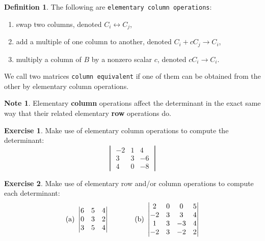\documentclass{beamer}
\newcommand{\fn}{\insertframenumber}
\theoremstyle{definition}
\newtheorem{exercise}{Exercise}
\newtheorem*{defn}{Definition}
\newtheorem*{nb}{Note}
\renewcommand{\emph}[1]{{\color{blue}\texttt{#1}}}
\begin{document}
\begin{frame}{\fn}
\begin{defn}
	The following are \emph{elementary column operations}:
	\begin{enumerate}[label=\textbf{\arabic*.}]
		\item swap two columns, denoted $C_i\leftrightarrow C_j$,
		\item add a multiple of one column to another, denoted $C_i+cC_j\rightarrow C_i$,
		\item multiply a column of $B$ by a nonzero scalar $c$, denoted $cC_i\rightarrow C_i$.
	\end{enumerate} 
	We call two matrices \emph{column equivalent} if one of them can be obtained from the other by elementary column operations.
\end{defn}
\begin{nb}
	Elementary \textbf{column} operations affect the determinant in the exact same way that their related elementary \textbf{row} operations do.
\end{nb}
\end{frame}
\begin{frame}{\fn}
\begin{exercise}
	Make use of elementary column operations to compute the determinant:
	\[\begin{vmatrix}
	-2 & 1 & 4 \\
	3 & 3 & -6 \\
	4 & 0 & -8
	\end{vmatrix}\]
\end{exercise}
\begin{exercise}
	Make use of elementary row and/or column operations to compute each determinant:
	\[\text{(a)}\ \begin{vmatrix}
	6 & 5 & 4 \\
	0 & 3 & 2 \\
	3 & 5 & 4
	\end{vmatrix}\hskip .5in \text{(b)}\ \begin{vmatrix}
	2 & 0 & 0 & 5 \\
	-2 & 3 & 3 & 4 \\
	1 & 3 & -3 & 4 \\
	-2 & 3 & -2 & 2
	\end{vmatrix}\]
\end{exercise}
\end{frame}
\end{document}
